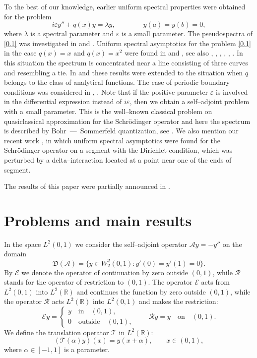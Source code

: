 \documentclass[10pt, a4paper]{article}
\theoremstyle{plain}
\theoremstyle{definition}
\numberwithin{equation}{section}
\def\cE{\mathcal{E}}
\begin{document}
To the best of our knowledge, earlier uniform spectral properties were obtained for the problem
\begin{equation}\label{0.1}
i\varepsilon y''+q(x)y=\lambda y, \qquad \qquad y(a)=y(b)=0,
\end{equation}
where $\lambda$ is a spectral parameter and $\varepsilon$ is a small parameter.
The pseudospectra of \eqref{0.1} was investigated in \cite{Reddy} and \cite{Trefethen}.
Uniform spectral asymptotics for the problem \eqref{0.1} in the case $q(x)=x$
and $q(x)=x^2$ were found in \cite{ShkalikovNotes97} and \cite{TumanovShkalikov02}, see also \cite{Stepin1}, \cite{Stepin2}, \cite{Morawetz},
\cite{DyachenkoShkalikov}, \cite{Shkalikov03},  \cite{Chapman}.
In this situation the spectrum is concentrated near a line consisting of three curves and resembling a tie.  In \cite{PokotiloShkalikov09} and \cite{IshkinMarv} these results were
extended to the situation when $q$ belongs to the class of analytical functions.
The case of periodic boundary conditions was considered in \cite{EsinaShafar1},
\cite{EsinaShafar2}. Note that if the positive parameter $\varepsilon$ is involved in
the differential expression instead of $i\varepsilon$, then we obtain a self--adjoint
problem with a small parameter. This is the well--known classical problem on quasiclassical approximation for the Schr\"odinger operator and here the spectrum is described by Bohr~---~Sommerfeld quantization, see  \cite{Shubin}. We also mention our recent work \cite{RJMP2024}, in which uniform spectral asymptotics were found for the Schr\"odinger operator on a segment with the Dirichlet condition, which was perturbed by a delta--interaction located at a point near one of the ends of segment.

The results of this paper were partially announced in \cite{LJM2024}.

\section{Problems and main results}

In the space $L^2(0, 1)$ we consider the self--adjoint operator  $\mathcal{A}y=-y''$
on the domain $$\mathfrak{D}(\mathcal{A})=\big\{y\in W_2^2(0, 1): y'(0)=y'(1)=0\big\}.$$   By
$\cE $ we denote the  operator of continuation by zero outside $(0, 1)$, while
$\mathcal{R}$ stands for the operator of restriction to $(0, 1)$.
The operator $\cE $ acts from $L^2(0, 1)$ into $L^2(\mathds{R})$ and
continues the function by zero outside $(0, 1)$, while the operator $\mathcal{R}$
acts $L^2(\mathds{R})$ into $L^2(0, 1)$ and makes the restriction:
\[
\cE y=
\begin{cases}
y \quad \text{in} \quad (0, 1), \\
0 \quad \text{outside} \quad (0, 1),
\end{cases}
\qquad \mathcal{R}y=y \quad \text{on} \quad (0, 1).
\]
We define the translation operator  $\mathcal{T}$ %
in $L^2(\mathds{R})$:
\[
(\mathcal{T}(\alpha) y)(x)=y(x+\alpha), \qquad  x\in (0, 1),
\]
where $\alpha\in [-1, 1]$ is a parameter.
\end{document}

